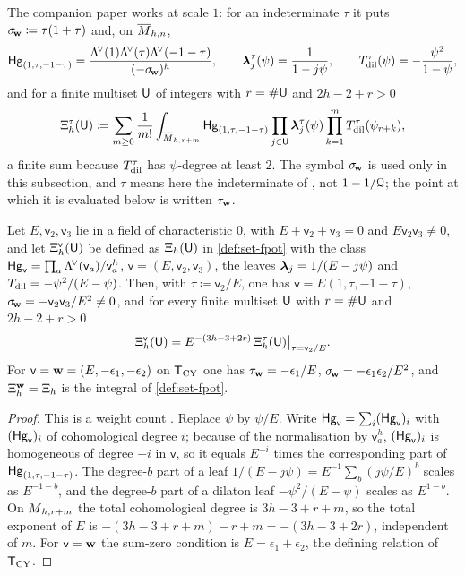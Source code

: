 The companion paper \cite{LP2} works at scale $1$: for an indeterminate $\tau$ it puts $\sigma_{\!\mathbf{w}}\coloneqq\tau(1+\tau)$ and, on $\overline{M}_{h,n}$,
\[
\mathsf{Hg}_{(1,\tau,-1-\tau)}=\frac{\Lambda^{\!\vee}(1)\Lambda^{\!\vee}(\tau)\Lambda^{\!\vee}(-1-\tau)}{(-\sigma_{\!\mathbf{w}})^h},\qquad
\boldsymbol{\lambda}^{\tau}_j(\psi)=\frac{1}{1-j\psi},\qquad
T_{\mathrm{dil}}^{\tau}(\psi)=-\frac{\psi^2}{1-\psi},
\]
and for a finite multiset $\mathsf{U}$ of integers with $r=\#\mathsf{U}$ and $2h-2+r>0$
\[
\Xi^{\tau}_h(\mathsf{U})\coloneqq\sum_{m\geq 0}\frac{1}{m!}\int_{\overline{M}_{h,r+m}}\mathsf{Hg}_{(1,\tau,-1-\tau)}\prod_{j\in\mathsf{U}}\boldsymbol{\lambda}^{\tau}_j(\psi)\prod_{k=1}^mT_{\mathrm{dil}}^{\tau}(\psi_{r+k}),
\]
a finite sum because $T_{\mathrm{dil}}^{\tau}$ has $\psi$-degree at least $2$. The symbol $\sigma_{\!\mathbf{w}}$ is used only in this subsection, and $\tau$ means here the indeterminate of \cite{LP2}, not $1-1/\mathcal{Q}$; the point at which it is evaluated below is written $\tau_{\mathbf{w}}$.

\begin{lem}
\label{lem:reg-scale}
Let $E,\mathsf{v}_2,\mathsf{v}_3$ lie in a field of characteristic $0$, with $E+\mathsf{v}_2+\mathsf{v}_3=0$ and $E\mathsf{v}_2\mathsf{v}_3\neq 0$, and let $\Xi^{\mathsf{v}}_h(\mathsf{U})$ be defined as $\Xi_h(\mathsf{U})$ in \cref{def:set-fpot} with the class $\mathsf{Hg}_{\mathsf{v}}=\prod_a\Lambda^{\!\vee}(\mathsf{v}_a)/\mathsf{v}_a^h$, $\mathsf{v}=(E,\mathsf{v}_2,\mathsf{v}_3)$, the leaves $\boldsymbol{\lambda}_j=1/(E-j\psi)$ and $T_{\mathrm{dil}}=-\psi^2/(E-\psi)$. Then, with $\tau\coloneqq\mathsf{v}_2/E$, one has $\mathsf{v}=E(1,\tau,-1-\tau)$, $\sigma_{\!\mathbf{w}}=-\mathsf{v}_2\mathsf{v}_3/E^2\neq 0$, and for every finite multiset $\mathsf{U}$ with $r=\#\mathsf{U}$ and $2h-2+r>0$
\begin{equation}
\label{eq:reg-scale}
\Xi^{\mathsf{v}}_h(\mathsf{U})=E^{-(3h-3+2r)}\,\Xi^{\tau}_h(\mathsf{U})\big|_{\tau=\mathsf{v}_2/E}.
\end{equation}
For $\mathsf{v}=\mathbf{w}=(E,-\epsilon_1,-\epsilon_2)$ on $\mathsf{T}_{\mathrm{CY}}$ one has $\tau_{\mathbf{w}}=-\epsilon_1/E$, $\sigma_{\!\mathbf{w}}=-\epsilon_1\epsilon_2/E^2$, and $\Xi^{\mathbf{w}}_h=\Xi_h$ is the integral of \cref{def:set-fpot}.
\end{lem}

\begin{proof}
This is a weight count \cite[Corollary~8.4]{LP2}. Replace $\psi$ by $\psi/E$. Write $\mathsf{Hg}_{\mathsf{v}}=\sum_i(\mathsf{Hg}_{\mathsf{v}})_i$ with $(\mathsf{Hg}_{\mathsf{v}})_i$ of cohomological degree $i$; because of the normalisation by $\mathsf{v}_a^h$, $(\mathsf{Hg}_{\mathsf{v}})_i$ is homogeneous of degree $-i$ in $\mathsf{v}$, so it equals $E^{-i}$ times the corresponding part of $\mathsf{Hg}_{(1,\tau,-1-\tau)}$. The degree-$b$ part of a leaf $1/(E-j\psi)=E^{-1}\sum_b(j\psi/E)^b$ scales as $E^{-1-b}$, and the degree-$b$ part of a dilaton leaf $-\psi^2/(E-\psi)$ scales as $E^{1-b}$. On $\overline{M}_{h,r+m}$ the total cohomological degree is $3h-3+r+m$, so the total exponent of $E$ is $-(3h-3+r+m)-r+m=-(3h-3+2r)$, independent of $m$. For $\mathsf{v}=\mathbf{w}$ the sum-zero condition is $E=\epsilon_1+\epsilon_2$, the defining relation of $\mathsf{T}_{\mathrm{CY}}$.
\end{proof}


